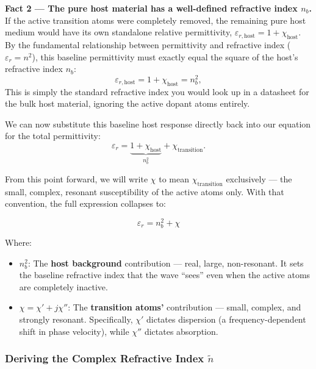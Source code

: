 \textbf{Fact 2 — The pure host material has a well-defined refractive index $n_b$.} If the active transition atoms were completely removed, the remaining pure host medium would have its own standalone relative permittivity, $\varepsilon_{r,\text{host}} = 1 + \chi_{\text{host}}$. By the fundamental relationship between permittivity and refractive index ($\varepsilon_r = n^2$), this baseline permittivity must exactly equal the square of the host's refractive index $n_b$:
\begin{equation*}
    \varepsilon_{r,\text{host}} = 1 + \chi_{\text{host}} = n_b^2,
\end{equation*}
This is simply the standard refractive index you would look up in a datasheet for the bulk host material, ignoring the active dopant atoms entirely.

We can now substitute this baseline host response directly back into our equation for the total permittivity:
\begin{equation*}
    \varepsilon_r = \underbrace{1 + \chi_{\text{host}}}_{n_b^2} + \chi_{\text{transition}}.
\end{equation*}

From this point forward, we will write $\chi$ to mean $\chi_{\text{transition}}$ exclusively — the small, complex, resonant susceptibility of the active atoms only. With that convention, the full expression collapses to:

\begin{keyresult}
    \begin{equation}
        \varepsilon_r = n_b^2 + \chi
    \end{equation}
\end{keyresult}
Where:
\begin{itemize}
    \item $n_b^2$: The \textbf{host background} contribution — real, large, non-resonant. It sets the baseline refractive index that the wave ``sees'' even when the active atoms are completely inactive.
    \item $\chi = \chi' + j\chi''$: The \textbf{transition atoms'} contribution — small, complex, and strongly resonant. Specifically, $\chi'$ dictates dispersion (a frequency-dependent shift in phase velocity), while $\chi''$ dictates absorption.
\end{itemize}

\subsubsection{Deriving the Complex Refractive Index \texorpdfstring{$\tilde{n}$}{ñ}}

